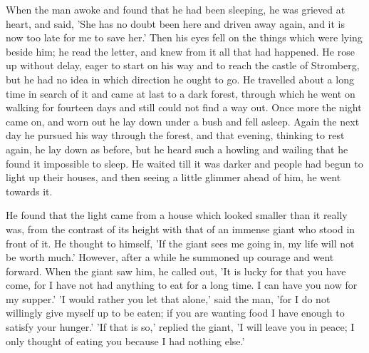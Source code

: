 \documentclass[12pt]{book}
\begin{document}
When the man awoke and found that he had been sleeping, he was grieved
at heart, and said, 'She has no doubt been here and driven away again,
and it is now too late for me to save her.' Then his eyes fell on the
things which were lying beside him; he read the letter, and knew from
it all that had happened. He rose up without delay, eager to start on
his way and to reach the castle of Stromberg, but he had no idea in
which direction he ought to go. He travelled about a long time in
search of it and came at last to a dark forest, through which he went
on walking for fourteen days and still could not find a way out. Once
more the night came on, and worn out he lay down under a bush and fell
asleep. Again the next day he pursued his way through the forest, and
that evening, thinking to rest again, he lay down as before, but he
heard such a howling and wailing that he found it impossible to sleep.
He waited till it was darker and people had begun to light up their
houses, and then seeing a little glimmer ahead of him, he went towards
it.

He found that the light came from a house which looked smaller than it
really was, from the contrast of its height with that of an immense
giant who stood in front of it. He thought to himself, 'If the giant
sees me going in, my life will not be worth much.' However, after a
while he summoned up courage and went forward. When the giant saw him,
he called out, 'It is lucky for that you have come, for I have not had
anything to eat for a long time. I can have you now for my supper.' 'I
would rather you let that alone,' said the man, 'for I do not
willingly give myself up to be eaten; if you are wanting food I have
enough to satisfy your hunger.' 'If that is so,' replied the giant, 'I
will leave you in peace; I only thought of eating you because I had
nothing else.'
\end{document}
